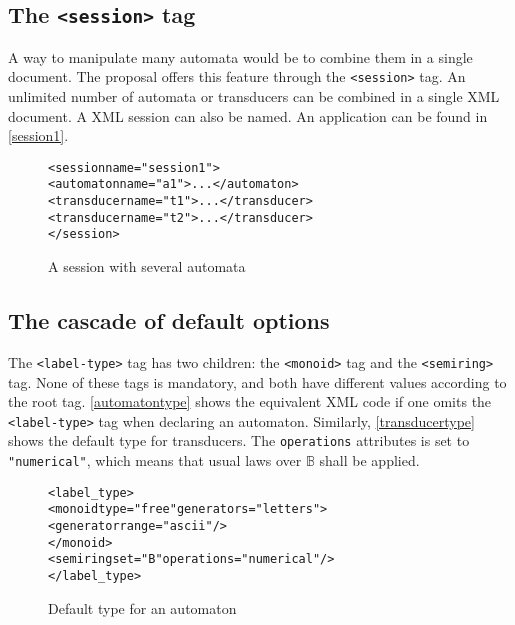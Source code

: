\documentclass[a4paper]{article}
\newcommand{\xtag}[1]{\texttt{<#1>}}
\newcommand{\xattr}[1]{\texttt{#1}}
\def\typetag{\xtag{label-type}}
\def\sessiontag{\xtag{session}}
\def\monoidtag{\xtag{monoid}}
\def\semiringtag{\xtag{semiring}}
\begin{document}
\subsection{The \sessiontag{} tag}

A way to manipulate many automata would be to combine them in a single
document. The proposal offers this feature through the \sessiontag{}
tag. An unlimited number of automata or transducers can be combined in
a single XML document. A XML session can also be named.  An
application can be found in \autoref{session1}.

\begin{figure}[ht]
  \small
  \begin{center}
\begin{alltt}
<session name="session1">
  <automaton name="a1">...</automaton>
  <transducer name="t1">...</transducer>
  <transducer name="t2">...</transducer>
</session>
\end{alltt}

\caption{A session with several automata}
\label{session1}
  \end{center}
\end{figure}

\subsection{The cascade of default options}

The \typetag{} tag has two children: the \monoidtag{} tag and the
\semiringtag{} tag. None of these tags is mandatory, and both have
different values according to the root tag. \autoref{automatontype}
shows the equivalent XML code if one omits the \typetag{} tag when
declaring an automaton. Similarly, \autoref{transducertype} shows the
default type for transducers.  The \xattr{operations} attributes is
set to \verb|"numerical"|, which means that usual laws over
$\mathbb{B}$ shall be applied.

\begin{figure}[ht]
  \begin{center}
\begin{alltt}
<label_type>
  <monoid type="free" generators="letters">
     <generator range="ascii"/>
  </monoid>
  <semiring set="B" operations="numerical"/>
</label_type>
\end{alltt}

\caption{Default type for an automaton}
\label{automatontype}
  \end{center}
\end{figure}
\end{document}
